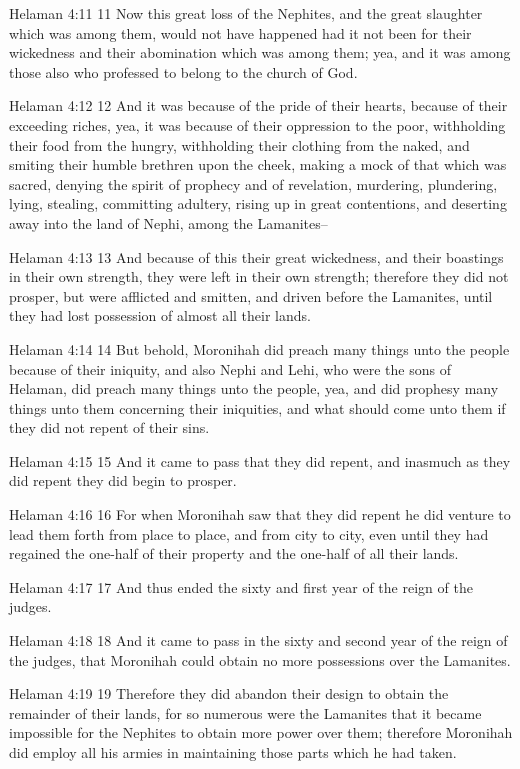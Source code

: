 Helaman 4:11
 11 Now this great loss of the Nephites, and the great slaughter
which was among them, would not have happened had it not been for
their wickedness and their abomination which was among them; yea,
and it was among those also who professed to belong to the church
of God.

Helaman 4:12
 12 And it was because of the pride of their hearts, because of
their exceeding riches, yea, it was because of their oppression
to the poor, withholding their food from the hungry, withholding
their clothing from the naked, and smiting their humble brethren
upon the cheek, making a mock of that which was sacred, denying
the spirit of prophecy and of revelation, murdering, plundering,
lying, stealing, committing adultery, rising up in great
contentions, and deserting away into the land of Nephi, among the
Lamanites--

Helaman 4:13
 13 And because of this their great wickedness, and their
boastings in their own strength, they were left in their own
strength; therefore they did not prosper, but were afflicted and
smitten, and driven before the Lamanites, until they had lost
possession of almost all their lands.

Helaman 4:14
 14 But behold, Moronihah did preach many things unto the people
because of their iniquity, and also Nephi and Lehi, who were the
sons of Helaman, did preach many things unto the people, yea, and
did prophesy many things unto them concerning their iniquities,
and what should come unto them if they did not repent of their
sins.

Helaman 4:15
 15 And it came to pass that they did repent, and inasmuch as
they did repent they did begin to prosper.

Helaman 4:16
 16 For when Moronihah saw that they did repent he did venture to
lead them forth from place to place, and from city to city, even
until they had regained the one-half of their property and the
one-half of all their lands.

Helaman 4:17
 17 And thus ended the sixty and first year of the reign of the
judges.

Helaman 4:18
 18 And it came to pass in the sixty and second year of the reign
of the judges, that Moronihah could obtain no more possessions
over the Lamanites.

Helaman 4:19
 19 Therefore they did abandon their design to obtain the
remainder of their lands, for so numerous were the Lamanites that
it became impossible for the Nephites to obtain more power over
them; therefore Moronihah did employ all his armies in
maintaining those parts which he had taken.

